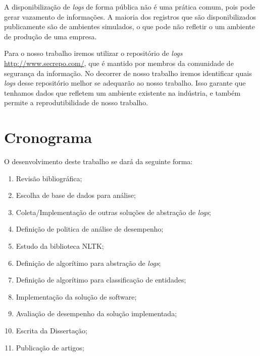 \documentclass[
	12pt,				%
	openright,			%
	twoside,			%
	a4paper,			%
	english,			%
	spanish,			%
	brazil,				%
	]{abntex2}
\begin{document}
A disponibilização de \emph{logs} de forma pública não é uma prática comum, pois pode gerar vazamento de informações. A maioria dos registros que são disponibilizados publicamente são de ambientes simulados, o que pode não refletir o um ambiente de produção de uma empresa.

Para o nosso trabalho iremos utilizar o repositório de \emph{logs} \url{http://www.secrepo.com/}, que é mantido por membros da comunidade de segurança da informação. No decorrer de nosso trabalho iremos identificar quais \emph{logs} desse repositório melhor se adequarão ao nosso trabalho. Isso garante que tenhamos dados que refletem um ambiente existente na indústria, e também permite a reprodutibilidade de nosso trabalho.

\chapter{Cronograma}\label{chap:cronograma}
O desenvolvimento deste trabalho se dará da seguinte forma:

\begin{enumerate}
	\item \label{rev-bibli} Revisão bibliográfica;
	\item \label{esc-base} Escolha de base de dados para análise;
	\item \label{imp-outras} Coleta/Implementação de outras soluções de abstração de \emph{logs};
	\item \label{def-pol} Definição de politica de análise de desempenho;
	\item \label{est-nltk} Estudo da biblioteca NLTK;
	\item \label{algo-abs} Definição de algorítimo para abstração de \emph{logs};
	\item \label{algo-clas} Definição de algorítimo para classificação de entidades;
	\item \label{imp-sol} Implementação da solução de software;
	\item \label{ava-des} Avaliação de desempenho da solução implementada;
	\item \label{esc-dis} Escrita da Dissertação;
	\item \label{pub-art} Publicação de artigos;	
\end{enumerate}
\end{document}

